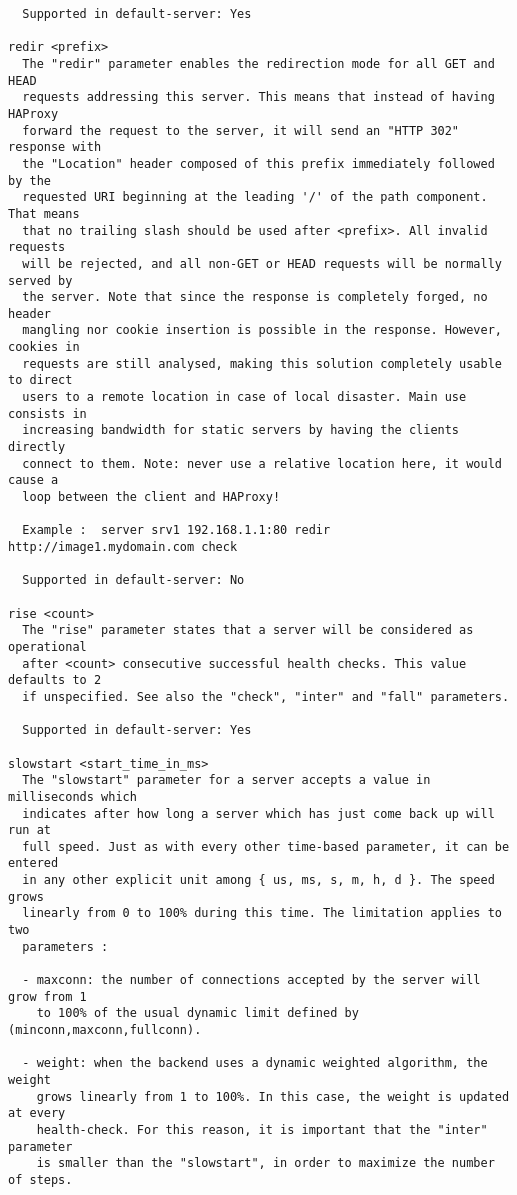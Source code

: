 \begin{verbatim}
  Supported in default-server: Yes

redir <prefix>
  The "redir" parameter enables the redirection mode for all GET and HEAD
  requests addressing this server. This means that instead of having HAProxy
  forward the request to the server, it will send an "HTTP 302" response with
  the "Location" header composed of this prefix immediately followed by the
  requested URI beginning at the leading '/' of the path component. That means
  that no trailing slash should be used after <prefix>. All invalid requests
  will be rejected, and all non-GET or HEAD requests will be normally served by
  the server. Note that since the response is completely forged, no header
  mangling nor cookie insertion is possible in the response. However, cookies in
  requests are still analysed, making this solution completely usable to direct
  users to a remote location in case of local disaster. Main use consists in
  increasing bandwidth for static servers by having the clients directly
  connect to them. Note: never use a relative location here, it would cause a
  loop between the client and HAProxy!

  Example :  server srv1 192.168.1.1:80 redir http://image1.mydomain.com check

  Supported in default-server: No

rise <count>
  The "rise" parameter states that a server will be considered as operational
  after <count> consecutive successful health checks. This value defaults to 2
  if unspecified. See also the "check", "inter" and "fall" parameters.

  Supported in default-server: Yes

slowstart <start_time_in_ms>
  The "slowstart" parameter for a server accepts a value in milliseconds which
  indicates after how long a server which has just come back up will run at
  full speed. Just as with every other time-based parameter, it can be entered
  in any other explicit unit among { us, ms, s, m, h, d }. The speed grows
  linearly from 0 to 100% during this time. The limitation applies to two
  parameters :

  - maxconn: the number of connections accepted by the server will grow from 1
    to 100% of the usual dynamic limit defined by (minconn,maxconn,fullconn).

  - weight: when the backend uses a dynamic weighted algorithm, the weight
    grows linearly from 1 to 100%. In this case, the weight is updated at every
    health-check. For this reason, it is important that the "inter" parameter
    is smaller than the "slowstart", in order to maximize the number of steps.


\end{verbatim}
